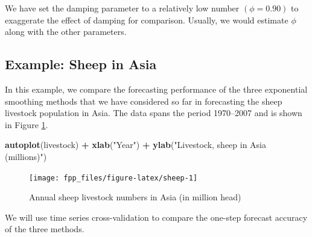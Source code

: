 \documentclass[]{book}
\newenvironment{Shaded}{\begin{snugshade}}{\end{snugshade}}
\newcommand{\KeywordTok}[1]{\textcolor[rgb]{0.13,0.29,0.53}{\textbf{#1}}}
\newcommand{\NormalTok}[1]{#1}
\newcommand{\OperatorTok}[1]{\textcolor[rgb]{0.81,0.36,0.00}{\textbf{#1}}}
\newcommand{\StringTok}[1]{\textcolor[rgb]{0.31,0.60,0.02}{#1}}
\begin{document}
We have set the damping parameter to a relatively low number \((\phi=0.90)\) to exaggerate the effect of damping for comparison. Usually, we would estimate \(\phi\) along with the other parameters.

\hypertarget{example-sheep-in-asia}{%
\subsection*{Example: Sheep in Asia}\label{example-sheep-in-asia}}

In this example, we compare the forecasting performance of the three exponential smoothing methods that we have considered so far in forecasting the sheep livestock population in Asia. The data spans the period 1970--2007 and is shown in Figure \ref{fig:sheep}.

\begin{Shaded}
\begin{Highlighting}[]
\KeywordTok{autoplot}\NormalTok{(livestock) }\OperatorTok{+}
\StringTok{  }\KeywordTok{xlab}\NormalTok{(}\StringTok{"Year"}\NormalTok{) }\OperatorTok{+}\StringTok{ }\KeywordTok{ylab}\NormalTok{(}\StringTok{"Livestock, sheep in Asia (millions)"}\NormalTok{)}
\end{Highlighting}
\end{Shaded}

\begin{figure}

{\centering \texttt{[image: fpp\_files/figure-latex/sheep-1]} 

}

\caption{Annual sheep livestock numbers in Asia (in million head)}\label{fig:sheep}
\end{figure}

We will use time series cross-validation to compare the one-step forecast accuracy of the three methods.
\end{document}
